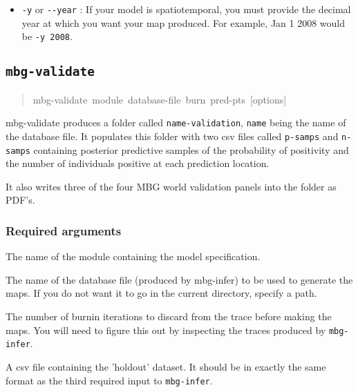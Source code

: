 \begin{itemize}
\item {} 
\texttt{-y} or \texttt{-{}-year} : If your model is spatiotemporal, you must provide the decimal year at
which you want your map produced. For example, Jan 1 2008 would be \texttt{-y 2008}.

\end{itemize}





\subsection{\texttt{mbg-validate}}
\label{sec:mbg-validate}
\begin{quote}{\ttfamily \raggedright \noindent
mbg-validate~module~database-file~burn~pred-pts~{[}options{]}
}\end{quote}

mbg-validate produces a folder called \texttt{name-validation}, \texttt{name} being the name of the database file.
It populates this folder with two csv files called \texttt{p-samps} and \texttt{n-samps} containing posterior
predictive samples of the probability of positivity and the number of individuals positive at each
prediction location.

It also writes three of the four MBG world validation panels into the folder as PDF's.





\subsubsection{Required arguments}
\label{sec:id8}
\setcounter{listcnt0}{0}
\begin{list}{.}
{
\setlength{\rightmargin}{\leftmargin}
}
\item {} 
The name of the module containing the model specification.

\item {} 
The name of the database file (produced by mbg-infer) to be used to generate the
maps. If you do not want it to go in the current directory, specify a path.

\item {} 
The number of burnin iterations to discard from the trace before making the maps.
You will need to figure this out by inspecting the traces produced by \texttt{mbg-infer}.

\item {} 
A csv file containing the 'holdout' dataset. It should be in exactly the same format
as the third required input to \texttt{mbg-infer}.

\end{list}


